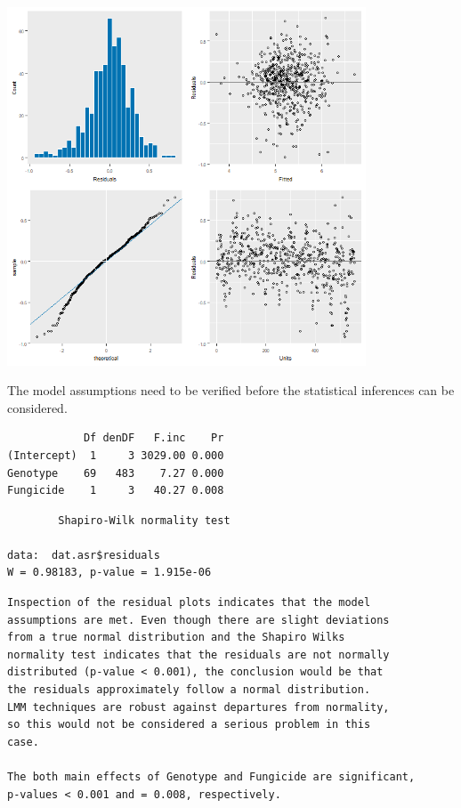 \documentclass[a4paper, 10pt, fleqn, twosided]{memoir}
\begin{document}
\begin{tcolorbox}[title = Example 5 Output]
\includegraphics[width=0.8\textwidth, frame]{Example5Resplot2.png}
\end{tcolorbox}

The model assumptions need to be verified before the statistical inferences can be considered.

\begin{tcolorbox}[title = Example 5 Shapiro-Wilk normality test output]
\begin{verbatim}
            Df denDF   F.inc    Pr
(Intercept)  1     3 3029.00 0.000
Genotype    69   483    7.27 0.000
Fungicide    1     3   40.27 0.008
\end{verbatim}
\tcblower
\begin{verbatim}
        Shapiro-Wilk normality test

data:  dat.asr$residuals
W = 0.98183, p-value = 1.915e-06
\end{verbatim}
\end{tcolorbox}

\begin{tcolorbox}[title = Example 5 Output Interpretation]
\begin{verbatim}
Inspection of the residual plots indicates that the model
assumptions are met. Even though there are slight deviations
from a true normal distribution and the Shapiro Wilks
normality test indicates that the residuals are not normally
distributed (p-value < 0.001), the conclusion would be that
the residuals approximately follow a normal distribution.
LMM techniques are robust against departures from normality,
so this would not be considered a serious problem in this
case.

The both main effects of Genotype and Fungicide are significant,
p-values < 0.001 and = 0.008, respectively.
\end{verbatim}
\end{tcolorbox}
\end{document}
